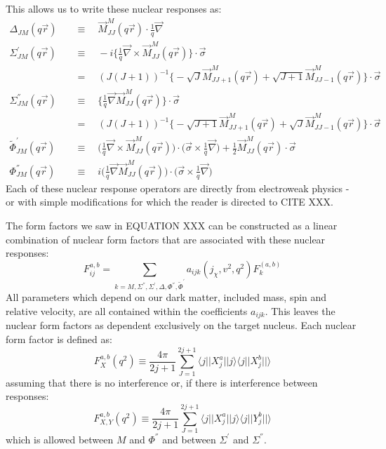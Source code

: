 This allows us to write these nuclear responses as:
\begin{equation}
\begin{split}
    \Delta_{JM}(q\vec{r})\quad &\equiv\quad \vec{M}_{JJ}^{M}(q\vec{r}) \cdot \frac{1}{q}\vec{\nabla} \\
    \Sigma^{'}_{JM}(q\vec{r})\quad &\equiv\quad -i \bigg\{ \frac{1}{q} \vec{\nabla} \times \vec{M}^{M}_{JJ}(q\vec{r}) \bigg\} \cdot \vec{\sigma} \\
    & =\quad (J(J + 1))^{-1}\bigg\{-\sqrt{J}\vec{M}^{M}_{JJ+1}(q\vec{r}) + \sqrt{J+1} \vec{M}^{M}_{JJ-1}(q\vec{r}) \bigg\} \cdot \vec{\sigma} \\
    \Sigma^{''}_{JM}(q\vec{r})\quad &\equiv\quad \bigg\{\frac{1}{q}\vec{\nabla}\vec{M}^{M}_{JJ}(q\vec{r}) \bigg\} \cdot \vec{\sigma} \\
    & =\quad (J(J + 1))^{-1} \bigg\{-\sqrt{J+1}\vec{M}^{M}_{JJ+1}(q\vec{r}) + \sqrt{J}\vec{M}^{M}_{JJ-1}(q\vec{r}) \bigg\} \cdot \vec{\sigma} \\
    \tilde{\Phi}^{'}_{JM}(q\vec{r})\quad &\equiv\quad \bigg( \frac{1}{q}\vec{\nabla} \times \vec{M}^{M}_{JJ}(q\vec{r}) \bigg) \cdot \bigg( \vec{\sigma} \times \frac{1}{q} \vec{\nabla} \bigg) + \frac{1}{2}\vec{M}^{M}_{JJ}(q\vec{r}) \cdot \vec{\sigma} \\
    \Phi^{''}_{JM}(q\vec{r})\quad &\equiv\quad i \bigg( \frac{1}{q}\vec{\nabla}\vec{M}^{M}_{JJ}(q\vec{r}) \bigg) \cdot \bigg( \vec{\sigma} \times \frac{1}{q}\vec{\nabla} \bigg)
\end{split}
\label{eq:eft_nuclear_response_operators}
\end{equation}
Each of these nuclear response operators are directly from electroweak physics - or with simple modifications for which the reader is directed to CITE XXX.
\par
The form factors we saw in EQUATION XXX can be constructed as a linear combination of nuclear form factors that are associated with these nuclear responses:
\begin{equation}
    F^{a,b}_{ij} = \sum_{k=M,\Sigma^{''},\Sigma^{'},\Delta, \Phi^{''},\tilde{\Phi}^{'}} a_{ijk}(j_\chi,v^2,q^2) F_{k}^{(a,b)}
    \label{eq:eft_form_factor_relation_to_nuclear_form_factors}
\end{equation}
All parameters which depend on our dark matter, included mass, spin and relative velocity, are all contained within the coefficients $a_{ijk}$.
This leaves the nuclear form factors as dependent exclusively on the target nucleus.
Each nuclear form factor is defined as:
\begin{equation}
    F^{a,b}_X(q^2) \equiv \frac{4 \pi}{2j + 1} \sum^{2j+1}_{J=1} \langle j || X^{a}_{j} || j \rangle \langle j || X^{b}_{j} || \rangle 
\end{equation}
assuming that there is no interference or, if there is interference between responses:
\begin{equation}
    F^{a,b}_{X,Y}(q^2) \equiv \frac{4 \pi}{2j + 1} \sum^{2j+1}_{J=1} \langle j || X^{a}_{j} || j \rangle \langle j || Y^{b}_{j} || \rangle 
\end{equation}
which is allowed between $M$ and $\Phi^{''}$ and between $\Sigma^{'}$ and $\Sigma^{''}$.

